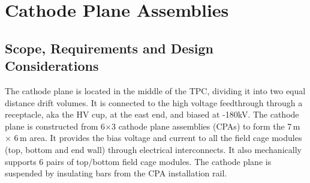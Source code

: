 


\section{Cathode Plane Assemblies}


\subsection{Scope, Requirements and Design Considerations}

The cathode plane is located in the middle of the TPC, dividing it into two equal distance drift volumes.  It is connected to the high voltage feedthrough through a receptacle, aka the HV cup, at the east end, and biased at -180kV.  The cathode plane is constructed from 6$\times$3 cathode plane assemblies (CPAs) to form the 7\,m $\times$ 6\,m area.  It provides the bias voltage and current to all the field cage modules (top, bottom and end wall) through electrical interconnects.  It also mechanically supports 6 pairs of top/bottom field cage modules.
The cathode plane is suspended by insulating bars from the CPA installation rail.



